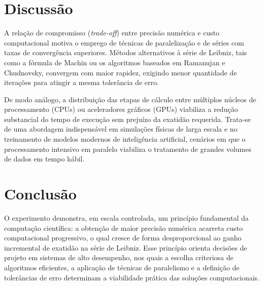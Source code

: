 \documentclass[11pt,letterpaper]{article}
\begin{document}
\section{Discussão}

A relação de compromisso (\textit{trade-off}) entre precisão numérica e custo computacional motiva o emprego de técnicas de paralelização e de séries com taxas de convergência superiores. Métodos alternativos à série de Leibniz, tais como a fórmula de Machin ou os algoritmos baseados em Ramanujan e Chudnovsky, convergem com maior rapidez, exigindo menor quantidade de iterações para atingir a mesma tolerância de erro.

De modo análogo, a distribuição das etapas de cálculo entre múltiplos núcleos de processamento (CPUs) ou aceleradores gráficos (GPUs) viabiliza a redução substancial do tempo de execução sem prejuízo da exatidão requerida. Trata-se de uma abordagem indispensável em simulações físicas de larga escala e no treinamento de modelos modernos de inteligência artificial, cenários em que o processamento intensivo em paralelo viabiliza o tratamento de grandes volumes de dados em tempo hábil.

\section{Conclusão}
O experimento demonstra, em escala controlada, um princípio fundamental da computação científica: a obtenção de maior precisão numérica acarreta custo computacional progressivo, o qual cresce de forma desproporcional ao ganho incremental de exatidão na série de Leibniz. Esse princípio orienta decisões de projeto em sistemas de alto desempenho, nos quais a escolha criteriosa de algoritmos eficientes, a aplicação de técnicas de paralelismo e a definição de tolerâncias de erro determinam a viabilidade prática das soluções computacionais.
\end{document}
